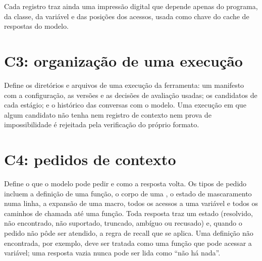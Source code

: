 Cada registro traz ainda uma impressão digital que depende apenas do programa,
da classe, da variável e das posições dos acessos, usada como chave do cache de
respostas do modelo.

\section{C3: organização de uma execução}

Define os diretórios e arquivos de uma execução da ferramenta: um manifesto com
a configuração, as versões e as decisões de avaliação usadas; os candidatos de
cada estágio; e o histórico das conversas com o modelo. Uma execução em que algum
candidato não tenha nem registro de contexto nem prova de impossibilidade é
rejeitada pela verificação do próprio formato.

\section{C4: pedidos de contexto}

Define o que o modelo pode pedir e como a resposta volta. Os tipos de pedido
incluem a definição de uma função, o corpo de uma \isr, o estado de mascaramento
numa linha, a expansão de uma macro, todos os acessos a uma variável e todos os
caminhos de chamada até uma função. Toda resposta traz um estado (resolvido, não encontrado, não suportado, truncado, ambíguo ou recusado) e, quando o
pedido não pôde ser atendido, a regra de recall que se aplica. Uma definição
não encontrada, por exemplo, deve ser tratada como uma função que pode acessar
a variável; uma resposta vazia nunca pode ser lida como ``não há nada''.
